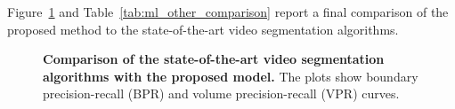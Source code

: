 Figure~\ref{fig:ml_all} and Table~\ref{tab:ml_other_comparison} report a final comparison of the proposed method to the state-of-the-art video segmentation algorithms. 
\begin{figure}[htbp]
 \centering
{}
\quad
{}
\caption[Comparison of the state-of-the-art video segmentation algorithms with the proposed model]{
{\bf Comparison of the state-of-the-art video segmentation algorithms with the proposed model.}
The plots show boundary precision-recall (BPR) and volume precision-recall (VPR) curves.}
\label{fig:ml_all}
\end{figure}
